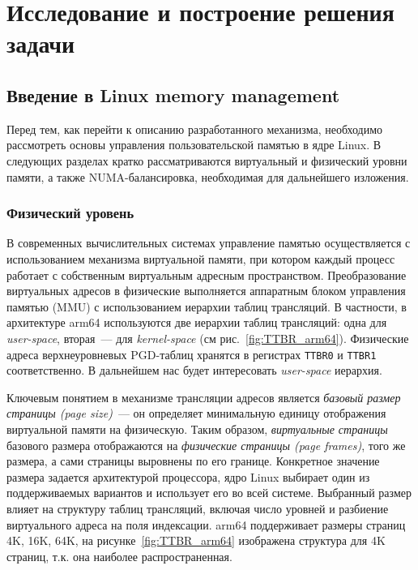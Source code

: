 \section{Исследование и построение решения задачи}
\label{sec:Chapter3} 


\subsection{Введение в Linux memory management}

Перед тем, как перейти к описанию разработанного механизма, необходимо рассмотреть основы управления пользовательской памятью в ядре Linux. В следующих разделах кратко рассматриваются виртуальный и физический уровни памяти, а также NUMA-балансировка, необходимая для дальнейшего изложения.

\subsubsection{Физический уровень}

В современных вычислительных системах управление памятью осуществляется с использованием механизма виртуальной памяти, при котором каждый процесс работает с собственным виртуальным адресным пространством. Преобразование виртуальных адресов в физические выполняется аппаратным блоком управления памятью (MMU) с использованием иерархии таблиц трансляций. В частности, в архитектуре arm64 используются две иерархии таблиц трансляций: одна для \textit{user-space}, вторая~--- для \textit{kernel-space} (см рис.~\ref{fig:TTBR_arm64}). Физические адреса верхнеуровневых PGD-таблиц хранятся в регистрах \texttt{TTBR0} и \texttt{TTBR1} соответственно. В дальнейшем нас будет интересовать \textit{user-space} иерархия.

Ключевым понятием в механизме трансляции адресов является \textit{базовый размер страницы (page size)}~--- он определяет минимальную единицу отображения виртуальной памяти на физическую. Таким образом, \textit{виртуальные страницы} базового размера отображаются на \textit{физические страницы (page frames)}, того же размера, а сами страницы выровнены по его границе. Конкретное значение размера задается архитектурой процессора, ядро Linux выбирает один из поддерживаемых вариантов и использует его во всей системе. Выбранный размер влияет на структуру таблиц трансляций, включая число уровней и разбиение виртуального адреса на поля индексации. arm64 поддерживает размеры страниц 4K, 16K, 64K, на рисунке~\ref{fig:TTBR_arm64} изображена структура для 4K страниц, т.к. она наиболее распространенная.

